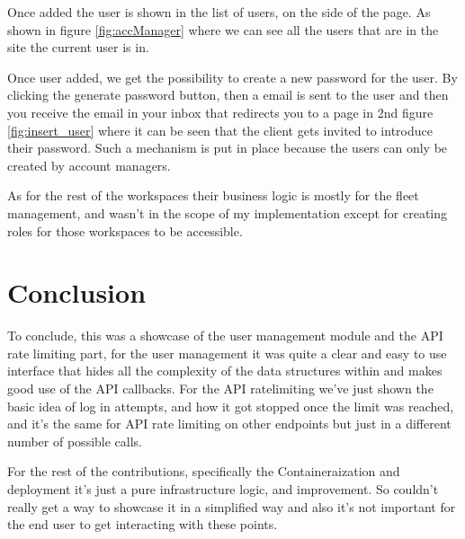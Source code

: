 Once added the user is shown in the list of users, on the side of the page. As shown in 
figure \ref{fig:accManager} where we can see all the users that are in the site the 
current user is in.

Once user added, we get the possibility to create a new password for the user. By clicking
the generate password button, then a email is sent to the user and then you receive the
email in your inbox that redirects you to a page in 2nd figure \ref{fig:insert_user} where
it can be seen that the client gets invited to introduce their password.
Such a mechanism is put in place because the users can only be created by account managers.

As for the rest of the workspaces their business logic is mostly for the fleet management, 
and wasn't in the scope of my implementation except for creating roles for those workspaces
to be accessible.

\section{Conclusion}

To conclude, this was a showcase of the user management module and the API rate limiting
part, for the user management it was quite a clear and easy to use interface that hides
all the complexity of the data structures within and makes good use of the API callbacks.
For the API ratelimiting we've just shown the basic idea of log in attempts, and how it
got stopped once the limit was reached, and it's the same for API rate limiting on other
endpoints but just in a different number of possible calls.

For the rest of the contributions, specifically the Containeraization and deployment
it's just a pure infrastructure logic, and improvement. So couldn't really get a way
to showcase it in a simplified way and also it's not important for the end user to
get interacting with these points.
